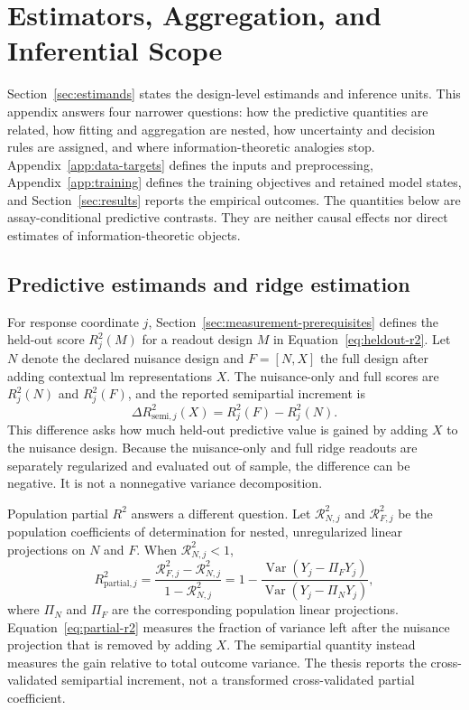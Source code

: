 \section{Estimators, Aggregation, and Inferential Scope}
\label{app:inference}

Section~\ref{sec:estimands} states the design-level estimands and inference units.
This appendix answers four narrower questions: how the predictive quantities are related, how fitting and aggregation are nested, how uncertainty and decision rules are assigned, and where information-theoretic analogies stop.
Appendix~\ref{app:data-targets} defines the inputs and preprocessing, Appendix~\ref{app:training} defines the training objectives and retained model states, and Section~\ref{sec:results} reports the empirical outcomes.
The quantities below are assay-conditional predictive contrasts.
They are neither causal effects nor direct estimates of information-theoretic objects.

\subsection{Predictive estimands and ridge estimation}

For response coordinate \(j\), Section~\ref{sec:measurement-prerequisites} defines the held-out score \(R_j^2(M)\) for a readout design \(M\) in Equation~\ref{eq:heldout-r2}.
Let \(N\) denote the declared nuisance design and \(F=[N,X]\) the full design after adding contextual \ac{lm} representations \(X\).
The nuisance-only and full scores are \(R_j^2(N)\) and \(R_j^2(F)\), and the reported semipartial increment is
\[
  \Delta R_{\mathrm{semi},j}^2(X)
  =
  R_j^2(F)-R_j^2(N).
\]
This difference asks how much held-out predictive value is gained by adding \(X\) to the nuisance design.
Because the nuisance-only and full ridge readouts are separately regularized and evaluated out of sample, the difference can be negative.
It is not a nonnegative variance decomposition. 

Population partial \(R^2\) answers a different question.
Let \(\mathcal R_{N,j}^2\) and \(\mathcal R_{F,j}^2\) be the population coefficients of determination for nested, unregularized linear projections on \(N\) and \(F\).
When \(\mathcal R_{N,j}^2<1\),
\begin{equation}
  R_{\mathrm{partial},j}^2
  =
  \frac{\mathcal R_{F,j}^2-\mathcal R_{N,j}^2}
       {1-\mathcal R_{N,j}^2}
  =
  1-
  \frac{\operatorname{Var}\!\left(Y_j-\Pi_FY_j\right)}
       {\operatorname{Var}\!\left(Y_j-\Pi_NY_j\right)},
  \label{eq:partial-r2}
\end{equation}
where \(\Pi_N\) and \(\Pi_F\) are the corresponding population linear projections.
Equation~\ref{eq:partial-r2} measures the fraction of variance left after the nuisance projection that is removed by adding \(X\).
The semipartial quantity instead measures the gain relative to total outcome variance.
The thesis reports the cross-validated semipartial increment, not a transformed cross-validated partial coefficient.

